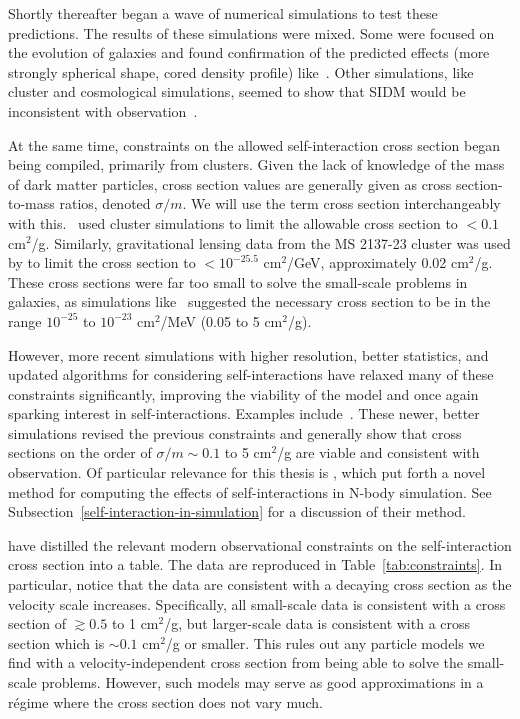 Shortly thereafter began a wave of numerical simulations to test these
predictions. The results of these simulations were mixed. Some were focused on
the evolution of galaxies and found confirmation of the predicted effects
(more strongly spherical shape, cored density profile)
like~\cite{burkert_structure_2000,dave_halo_2001}. Other simulations, like
cluster and cosmological simulations, seemed to show that SIDM would be
inconsistent with
observation~\cite{moore_collisional_2000,yoshida_collisional_2000,yoshida_weakly_2000}.

At the same time, constraints on the allowed self-interaction cross section
began being compiled, primarily from clusters. Given the lack of knowledge of
the mass of dark matter particles, cross section values are generally given as
cross section-to-mass ratios, denoted $\sigma/m$. We will use the term cross
section interchangeably with this. \cite{meneghetti_giant_2001}~used cluster
simulations to limit the allowable cross section to \(< 0.1\) cm\(^2\)/g.
Similarly, gravitational lensing data from the MS 2137-23 cluster was used by
\cite{miralda-escude_test_2002} to limit the cross section to \(< 10^{-25.5}\)
cm\(^2\)/GeV, approximately 0.02 cm\(^2\)/g. These cross sections were far too
small to solve the small-scale problems in galaxies, as simulations
like~\cite{dave_halo_2001} suggested the necessary cross section to be in the
range \(10^{-25}\) to \(10^{-23}\) cm\(^2\)/MeV (0.05 to 5 cm\(^2\)/g).

However, more recent simulations with higher resolution, better statistics,
and updated algorithms for considering self-interactions have relaxed many of
these constraints significantly, improving the viability of the model and once
again sparking interest in self-interactions. Examples
include~\cite{rocha_cosmological_2013,peter_cosmological_2013,zavala_constraining_2013,elbert_core_2015}.
These newer, better simulations revised the previous constraints and generally
show that cross sections on the order of $\sigma / m \sim 0.1$ to 5
cm$^2$/g are viable and consistent with observation. Of particular relevance
for this thesis is \cite{rocha_cosmological_2013}, which put forth a novel
method for computing the effects of self-interactions in N-body simulation.
See Subsection~\ref{self-interaction-in-simulation} for a discussion of their
method.

\cite{tulin_dark_2018} have distilled the relevant modern observational
constraints on the self-interaction cross section into a table. The data are
reproduced in Table~\ref{tab:constraints}. In particular, notice that the data
are consistent with a decaying cross section as the velocity scale increases.
Specifically, all small-scale data is consistent with a cross section of
$\gtrsim 0.5$ to 1 cm$^2$/g, but larger-scale data is consistent with a cross
section which is $\sim 0.1$ cm$^2$/g or smaller.  This rules out any particle
models we find with a velocity-independent cross section from being able to
solve the small-scale problems.  However, such models may serve as good
approximations in a régime where the cross section does not vary much.

